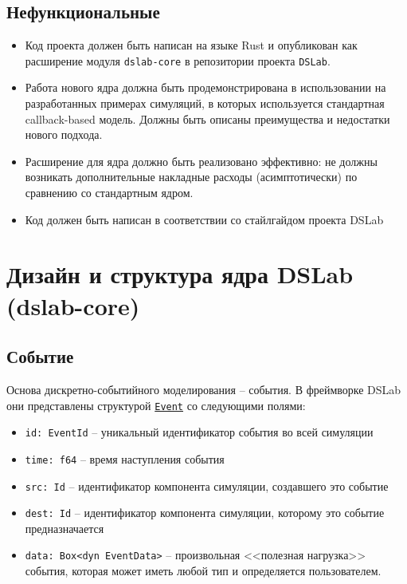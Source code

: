 \subsection{Нефункциональные}
\begin{itemize}
    \item Код проекта должен быть написан на языке Rust и опубликован как расширение модуля \texttt{dslab-core} в репозитории проекта \texttt{DSLab}\cite{dslab-repo}.
    \item Работа нового ядра должна быть продемонстрирована в использовании на разработанных примерах симуляций, в которых используется стандартная callback-based модель. Должны быть описаны преимущества и недостатки нового подхода.
    \item Расширение для ядра должно быть реализовано эффективно: не должны возникать дополнительные накладные расходы (асимптотически) по сравнению со стандартным ядром.
    \item Код должен быть написан в соответствии со стайлгайдом проекта DSLab
\end{itemize}




\section{Дизайн и структура ядра DSLab (dslab-core)} \label{dslab-core-design}

\subsection{Событие} \label{Event}
Основа дискретно-событийного моделирования -- события. В фреймворке DSLab они представлены структурой \underline{\texttt{Event}} со следующими полями: 
\begin{itemize}
    \item \texttt{id: EventId} -- уникальный идентификатор события во всей симуляции
    \item \texttt{time: f64} -- время наступления события 
    \item \texttt{src: Id} -- идентификатор компонента симуляции, создавшего это событие 
    \item \texttt{dest: Id} -- идентификатор компонента симуляции, которому это событие предназначается
    \item \label{Event:payload} \texttt{data: Box<dyn EventData>} -- произвольная <<полезная нагрузка>> события, которая может иметь любой тип и определяется пользователем. 
\end{itemize}

